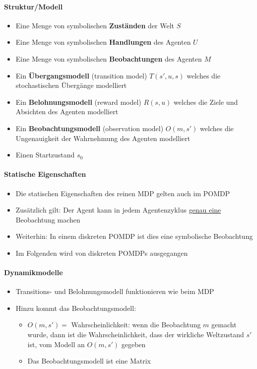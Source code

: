 \paragraph{Struktur/Modell}
\begin{itemize}
	\item Eine Menge von symbolischen \textbf{Zust\"anden} der Welt $S$
	\item Eine Menge von symbolischen \textbf{Handlungen} des Agenten $U$
	\item Eine Menge von symbolischen \textbf{Beobachtungen} des Agenten $M$
	\item Ein \textbf{\"Ubergangsmodell} (transition model) $T(s', u, s)$ welches die stochastischen \"Uberg\"ange modelliert
	\item Ein \textbf{Belohnungsmodell} (reward model) $R(s,u)$ welches die Ziele und Absichten des Agenten modelliert
	\item Ein \textbf{Beobachtungsmodell} (observation model) $O(m, s')$ welches die Ungenauigkeit der Wahrnehmung des Agenten modelliert
	\item Einen Startzustand $s_0$
\end{itemize}

\paragraph{Statische Eigenschaften}
\begin{itemize}
	\item Die statischen Eigenschaften des reinen MDP gelten auch im POMDP
	\item Zusätzlich gilt: Der Agent kann in jedem Agentenzyklus \underline{genau eine} Beobachtung machen
	\item Weiterhin: In einem diskreten POMDP ist dies eine symbolische Beobachtung
	\item Im Folgenden wird von diskreten POMDPs ausgegangen
\end{itemize}

\paragraph{Dynamikmodelle}
\begin{itemize}
	\item Transitions- und Belohnungsmodell funktionieren wie beim MDP
	\item Hinzu kommt das Beobachtungsmodell:
	\begin{itemize}
		\item $O(m,s') =$ Wahrscheinlichkeit: wenn die Beobachtung $m$ gemacht wurde, dann ist die Wahrscheinlichkeit, dass der wirkliche Weltzustand $s'$ ist, vom Modell an $O(m,s')$ gegeben
		\item Das Beobachtungsmodell ist eine Matrix
	\end{itemize}
\end{itemize}

